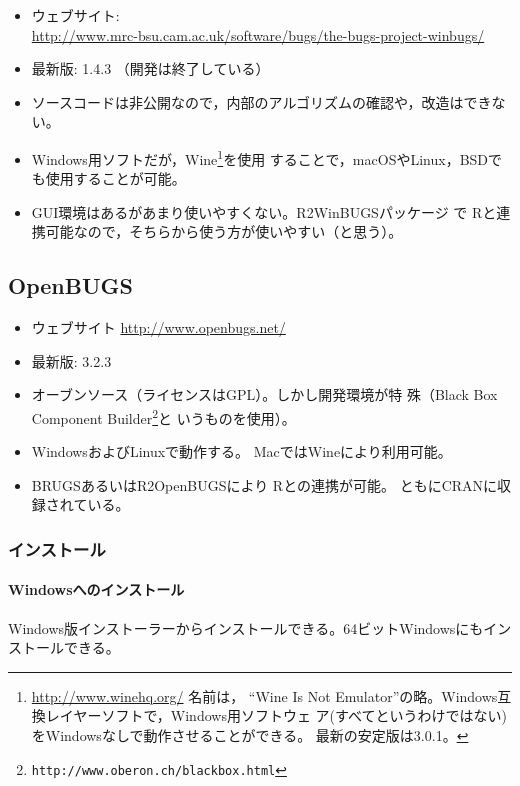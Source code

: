 \documentclass[11pt,uplatex]{jsarticle}
\begin{document}
\begin{itemize}
\item ウェブサイト:\\
  \url{http://www.mrc-bsu.cam.ac.uk/software/bugs/the-bugs-project-winbugs/}
\item 最新版: 1.4.3 （開発は終了している）
\item ソースコードは非公開なので，内部のアルゴリズムの確認や，改造はできない。
\item Windows用ソフトだが，\textsf{Wine}\footnote{\url{http://www.winehq.org/} 名前は，
``Wine Is Not Emulator''の略。Windows互換レイヤーソフトで，Windows用ソフトウェ
  ア(すべてというわけではない)をWindowsなしで動作させることができる。
  最新の安定版は3.0.1。}を使用
  することで，macOSやLinux，BSDでも使用することが可能。
\item GUI環境はあるがあまり使いやすくない。\textsf{R2WinBUGS}パッケージ
  で \textsf{R}と連携可能なので，そちらから使う方が使いやすい（と思う）。
\end{itemize}

\subsection{OpenBUGS}

\begin{itemize}
\item ウェブサイト \url{http://www.openbugs.net/}
\item 最新版: 3.2.3
\item オーブンソース（ライセンスはGPL）。しかし開発環境が特
  殊（Black Box Component Builder\footnote{\texttt{http://www.oberon.ch/blackbox.html}}と
  いうものを使用）。
\item WindowsおよびLinuxで動作する。
Macでは\textsf{Wine}により利用可能。
\item \textsf{BRUGS}あるいは\textsf{R2OpenBUGS}により
\textsf{R}との連携が可能\cite{Thomas}。
ともにCRANに収録されている。
\end{itemize}

\subsubsection*{インストール}
\paragraph{Windowsへのインストール}
Windows版インストーラーからインストールできる。64ビットWindowsにもインストールできる。
\end{document}
